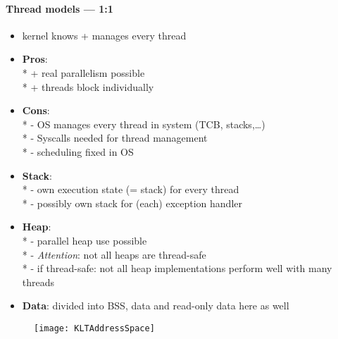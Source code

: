 \paragraph{Thread models --- 1:1}
\begin{itemize}
  \item kernel knows + manages every thread
  \item \textbf{Pros}: \\*
    + real parallelism possible \\*
    + threads block individually
  \item \textbf{Cons}: \\*
    - OS manages every thread in system (TCB, stacks,\dots) \\*
    - Syscalls needed for thread management \\*
    - scheduling fixed in OS
  \item \textbf{Stack}: \\*
    - own execution state (= stack) for every thread \\*
    - possibly own stack for (each) exception handler
  \item \textbf{Heap}: \\*
    - parallel heap use possible \\*
    - \emph{Attention}: not all heaps are thread-safe \\*
    - if thread-safe: not all heap implementations perform well with many threads
  \item \textbf{Data}: divided into BSS, data and read-only data here as well
\end{itemize}
\begin{figure}[h]\centering\label{KLTAddressSpace}\texttt{[image: KLTAddressSpace]}\end{figure}

